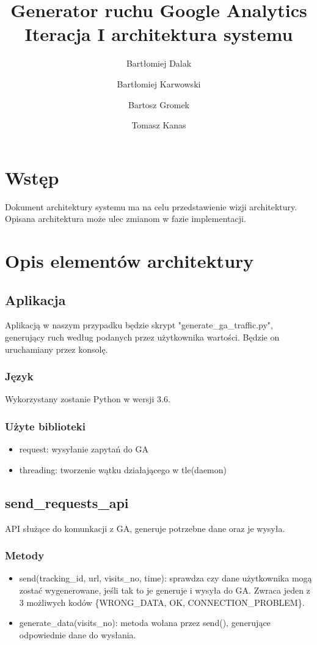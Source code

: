 \documentclass{article}
\title{Generator ruchu Google Analytics \\ Iteracja I architektura systemu}
\author{Bartłomiej Dalak \and Bartłomiej Karwowski \and Bartosz Gromek \and Tomasz Kanas}
\begin{document}
\maketitle

\section{Wstęp}

Dokument architektury systemu ma na celu przedstawienie wizji architektury. Opisana architektura może ulec zmianom w fazie implementacji.

\section{Opis elementów architektury}

\subsection{Aplikacja}

Aplikacją w naszym przypadku będzie skrypt "generate\_ga\_traffic.py", generujący ruch według podanych przez użytkownika wartości. Będzie on uruchamiany przez konsolę.

\subsubsection{Język}

Wykorzystany zostanie Python w wersji 3.6.

\subsubsection{Użyte biblioteki}

\begin{itemize}
\item request: wysyłanie zapytań do GA
\item threading: tworzenie wątku działającego w tle(daemon)
\end{itemize}

\subsection{send\_requests\_api}
API służące do komunkacji z GA, generuje potrzebne dane oraz je wysyła.

\subsubsection{Metody}
\begin{itemize}
\item send(tracking\_id, url, visits\_no, time): sprawdza czy dane użytkownika mogą zostać wygenerowane, jeśli tak to je generuje  i wysyła do GA. Zwraca jeden z 3 możliwych kodów \{WRONG\_DATA, OK, CONNECTION\_PROBLEM\}.
\item generate\_data(visits\_no): metoda wołana przez send(), generujące odpowiednie dane do wysłania.
\end{itemize}
\end{document}
